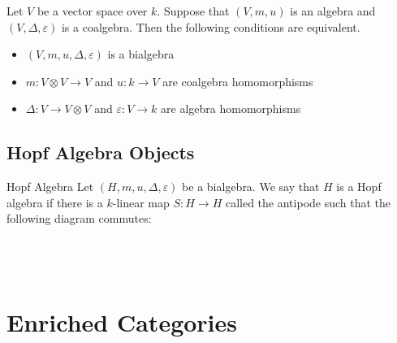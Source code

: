 \documentclass[a4paper]{article}
\begin{document}
\begin{thm}{}{} Let $V$ be a vector space over $k$. Suppose that $(V,m,u)$ is an algebra and $(V,\Delta,\varepsilon)$ is a coalgebra. Then the following conditions are equivalent. 
\begin{itemize}
\item $(V,m,u,\Delta,\varepsilon)$ is a bialgebra
\item $m:V\otimes V\to V$ and $u:k\to V$ are coalgebra homomorphisms
\item $\Delta:V\to V\otimes V$ and $\varepsilon:V\to k$ are algebra homomorphisms
\end{itemize}
\end{thm}

\subsection{Hopf Algebra Objects}
\begin{defn}{Hopf Algebra}{} Let $(H,m,u,\Delta,\varepsilon)$ be a bialgebra. We say that $H$ is a Hopf algebra if there is a $k$-linear map $S:H\to H$ called the antipode such that the following diagram commutes: \\~\\
\\~\\
\end{defn}

\pagebreak
\section{Enriched Categories}
\end{document}
